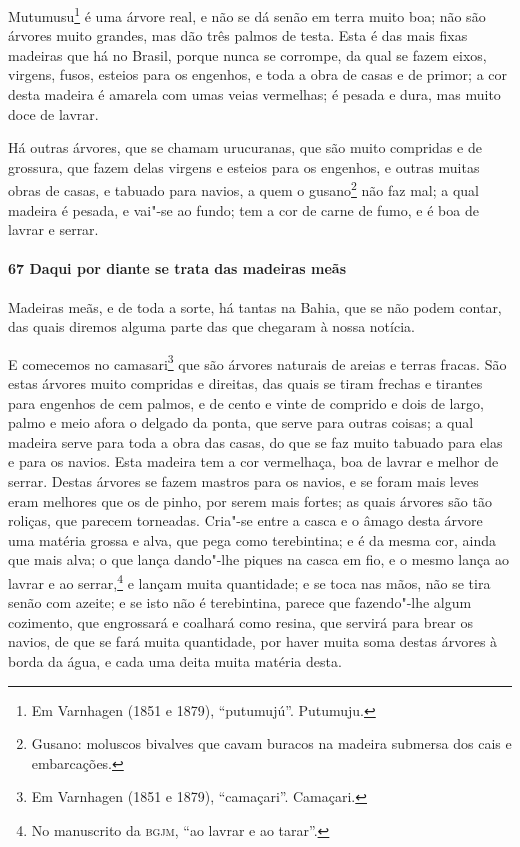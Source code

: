 \begin{linenumbers}
Mutumusu\footnote{ Em Varnhagen (1851 e 1879), ``putumujú''. Putumuju.} é uma árvore real,
e não se dá senão em terra muito boa; não são árvores muito grandes, mas dão três palmos
de testa. Esta é das mais fixas madeiras que há no Brasil, porque nunca se corrompe, da
qual se fazem eixos, virgens, fusos, esteios para os engenhos, e toda a obra de casas e de
primor; a cor desta madeira é amarela com umas veias vermelhas; é pesada e dura, mas muito
doce de lavrar.

Há outras árvores, que se chamam urucuranas, que são muito compridas e de grossura, que
fazem delas virgens e esteios para os engenhos, e outras muitas obras de casas, e tabuado
para navios, a quem o gusano\footnote{ Gusano: moluscos bivalves que cavam buracos na
madeira submersa dos cais e embarcações.} não faz mal; a qual madeira é pesada, e vai"-se
ao fundo; tem a cor de carne de fumo, e é boa de lavrar e serrar.

\paragraph{67 Daqui por diante se trata das madeiras meãs}\quad
Madeiras meãs, e de toda a sorte, há tantas na Bahia, que se não podem contar, das quais
diremos alguma parte das que chegaram à nossa notícia.

E comecemos no camasari\footnote{ Em Varnhagen (1851 e 1879), ``camaçari''. Camaçari.} que
são árvores naturais de areias e terras fracas. São estas árvores muito compridas e
direitas, das quais se tiram frechas e tirantes para engenhos de cem palmos, e de cento e
vinte de comprido e dois de largo, palmo e meio afora o delgado da ponta, que serve para
outras coisas; a qual madeira serve para toda a obra das casas, do que se faz muito
tabuado para elas e para os navios. Esta madeira tem a cor vermelhaça, boa de lavrar e
melhor de serrar. Destas árvores se fazem mastros para os navios, e se foram mais leves
eram melhores que os de pinho, por serem mais fortes; as quais árvores são tão roliças,
que parecem torneadas. Cria"-se entre a casca e o âmago desta árvore uma matéria grossa e
alva, que pega como terebintina; e é da mesma cor, ainda que mais alva; o que lança
dando"-lhe piques na casca em fio, e o mesmo lança ao lavrar e ao serrar,\footnote{ No
manuscrito da \textsc{bgjm}, ``ao lavrar e ao tarar''.} e lançam muita quantidade; e se
toca nas mãos, não se tira senão com azeite; e se isto não é terebintina, parece que
fazendo"-lhe algum cozimento, que engrossará e coalhará como resina, que servirá para brear
os navios, de que se fará muita quantidade, por haver muita soma destas árvores à borda da
água, e cada uma deita muita matéria desta.


\end{linenumbers}
